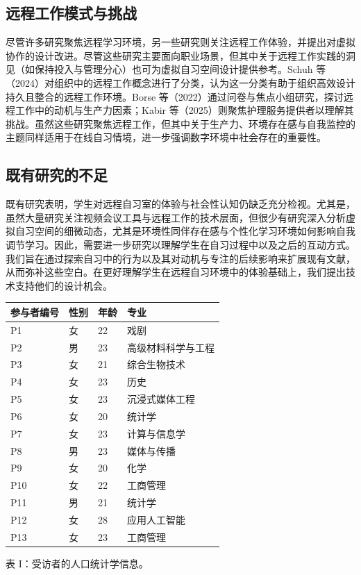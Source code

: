\documentclass[12pt]{ctexart}
\begin{document}
\subsection{远程工作模式与挑战}
尽管许多研究聚焦远程学习环境，另一些研究则关注远程工作体验，并提出对虚拟协作的设计改进。尽管这些研究主要面向职业场景，但其中关于远程工作实践的洞见（如保持投入与管理分心）也可为虚拟自习空间设计提供参考。Schuh 等（2024）对组织中的远程工作概念进行了分类，认为这一分类有助于组织高效设计持久且整合的远程工作环境。Borse 等（2022）通过问卷与焦点小组研究，探讨远程工作中的动机与生产力因素；Kabir 等（2025）则聚焦护理服务提供者以理解其挑战。虽然这些研究聚焦远程工作，但其中关于生产力、环境存在感与自我监控的主题同样适用于在线自习情境，进一步强调数字环境中社会存在的重要性。

\subsection{既有研究的不足}
既有研究表明，学生对远程自习室的体验与社会性认知仍缺乏充分检视。尤其是，虽然大量研究关注视频会议工具与远程工作的技术层面，但很少有研究深入分析虚拟自习空间的细微动态，尤其是环境性同伴存在感与个性化学习环境如何影响自我调节学习。因此，需要进一步研究以理解学生在自习过程中以及之后的互动方式。我们旨在通过探索自习中的行为以及其对动机与专注的后续影响来扩展现有文献，从而弥补这些空白。在更好理解学生在远程自习环境中的体验基础上，我们提出技术支持他们的设计机会。

\begin{table}[H]
\centering
\small
\begin{tabular}{llll}
\toprule
参与者编号 & 性别 & 年龄 & 专业 \\
\midrule
P1 & 女 & 22 & 戏剧 \\
P2 & 男 & 23 & 高级材料科学与工程 \\
P3 & 女 & 21 & 综合生物技术 \\
P4 & 女 & 23 & 历史 \\
P5 & 女 & 23 & 沉浸式媒体工程 \\
P6 & 女 & 20 & 统计学 \\
P7 & 女 & 23 & 计算与信息学 \\
P8 & 男 & 23 & 媒体与传播 \\
P9 & 女 & 20 & 化学 \\
P10 & 女 & 22 & 工商管理 \\
P11 & 男 & 21 & 统计学 \\
P12 & 女 & 28 & 应用人工智能 \\
P13 & 女 & 23 & 工商管理 \\
\bottomrule
\end{tabular}
\end{table}
表 I：受访者的人口统计学信息。
\end{document}
